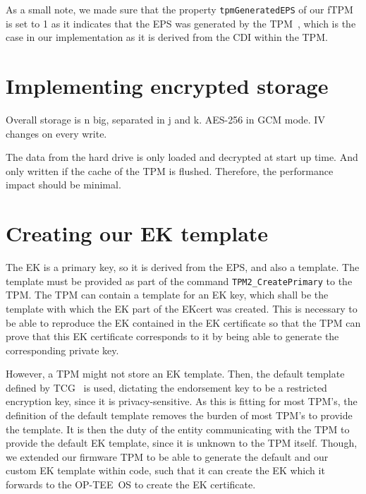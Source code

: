 As a small note, we made sure that the property \texttt{tpmGeneratedEPS} of our fTPM is set to 1 as it indicates that the EPS was generated by the TPM~\cite{tpm}, which is the case in our implementation as it is derived from the CDI within the TPM\@.



\section{Implementing encrypted storage}

Overall storage is n big, separated in j and k.
AES-256 in GCM mode.
IV changes on every write.

The data from the hard drive is only loaded and decrypted at start up time.
And only written if the cache of the TPM is flushed.
Therefore, the performance impact should be minimal.


\section{Creating our EK template}

The EK is a primary key, so it is derived from the EPS, and also a template.
The template must be provided as part of the command \texttt{TPM2\_CreatePrimary} to the TPM\@.
The TPM can contain a template for an EK key, which shall be the template with which the EK part of the EKcert was created.
This is necessary to be able to reproduce the EK contained in the EK certificate so that the TPM can prove that this EK certificate corresponds to it by being able to generate the corresponding private key.

However, a TPM might not store an EK template.
Then, the default template defined by TCG~\cite{tcg-ek} is used, dictating the endorsement key to be a restricted encryption key, since it is privacy-sensitive.
As this is fitting for most TPM's, the definition of the default template removes the burden of most TPM's to provide the template.
It is then the duty of the entity communicating with the TPM to provide the default EK template, since it is unknown to the TPM itself.
Though, we extended our firmware TPM to be able to generate the default and our custom EK template within code, such that it can create the EK which it forwards to the OP-TEE~OS to create the EK certificate.

